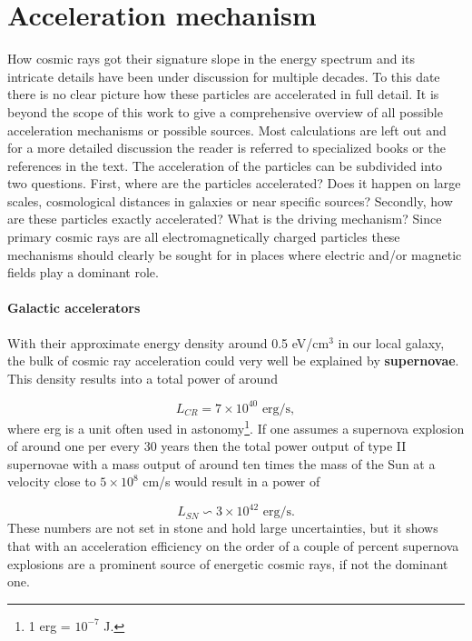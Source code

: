 \section{Acceleration mechanism}
How cosmic rays got their signature slope in the energy spectrum and its intricate details have been under discussion for multiple decades. To this date there is no clear picture how these particles are accelerated in full detail. It is beyond the scope of this work to give a comprehensive overview of all possible acceleration mechanisms or possible sources. Most calculations are left out and for a more detailed discussion the reader is referred to specialized books or the references in the text.
\newline
The acceleration of the particles can be subdivided into two questions. First, where are the particles accelerated? Does it happen on large scales, cosmological distances in galaxies or near specific sources? Secondly, how are these particles exactly accelerated? What is the driving mechanism? Since primary cosmic rays are all electromagnetically charged particles these mechanisms should clearly be sought for in places where electric and/or magnetic fields play a dominant role.

\paragraph{Galactic accelerators}
With their approximate energy density around 0.5 eV/cm$^3$ in our local galaxy, the bulk of cosmic ray acceleration could very well be explained by \textbf{supernovae}. This density results into a total power of around

\begin{equation}
L_{CR} = 7 \times 10^{40} \textrm{ erg/s},
\end{equation}
where erg is a unit often used in astonomy\footnote{1 erg = $10^{-7}$ J.}. If one assumes a supernova explosion of around one per every 30 years then the total power output of type II supernovae with a mass output of around ten times the mass of the Sun at a velocity close to $5 \times 10^{8}$ cm/s would result in a power of

\begin{equation}
L_{SN} \backsim 3 \times 10^{42} \textrm{ erg/s}.
\end{equation}
These numbers are not set in stone and hold large uncertainties, but it shows that with an acceleration efficiency on the order of a couple of percent supernova explosions are a prominent source of energetic cosmic rays, if not the dominant one.

